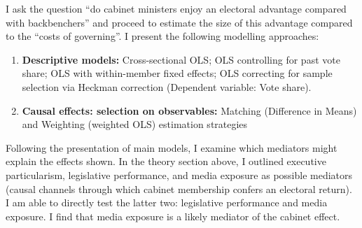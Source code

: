 \documentclass[letter,12pt]{article}
\begin{document}
I ask the question ``do cabinet ministers enjoy an electoral advantage compared with backbenchers'' and proceed to estimate the size of this advantage compared to the ``costs of governing''.  I present the following modelling approaches:

\begin{enumerate}
	\item \textbf{Descriptive models:} Cross-sectional OLS; OLS controlling for past vote share; OLS with within-member fixed effects; OLS correcting for sample selection via Heckman correction (Dependent variable: Vote share).
	\item \textbf{Causal effects: selection on observables:} Matching (Difference in Means) and Weighting (weighted OLS) estimation strategies
\end{enumerate}

Following the presentation of main models, I examine which mediators might explain the effects shown. In the theory section above, I outlined executive particularism, legislative performance, and media exposure as possible mediators (causal channels through which cabinet membership confers an electoral return). I am able to directly test the latter two: legislative performance and media exposure. I find that media exposure is a likely mediator of the cabinet effect.
\end{document}
